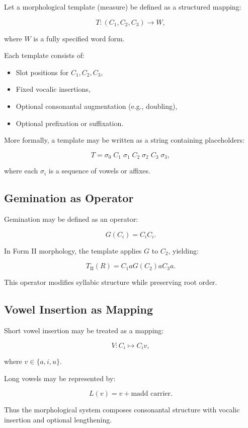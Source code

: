 \documentclass[11pt]{article}
\begin{document}
Let a morphological template (measure) be defined as a structured mapping:

\[
T : (C_1, C_2, C_3) \rightarrow W,
\]

where $W$ is a fully specified word form.

Each template consists of:

\begin{itemize}
\item Slot positions for $C_1, C_2, C_3$,
\item Fixed vocalic insertions,
\item Optional consonantal augmentation (e.g., doubling),
\item Optional prefixation or suffixation.
\end{itemize}

More formally, a template may be written as a string containing placeholders:

\[
T = \sigma_0 \; C_1 \; \sigma_1 \; C_2 \; \sigma_2 \; C_3 \; \sigma_3,
\]

where each $\sigma_i$ is a sequence of vowels or affixes.

\subsection{Gemination as Operator}

Gemination may be defined as an operator:

\[
G(C_i) = C_i C_i.
\]

In Form II morphology, the template applies $G$ to $C_2$, yielding:

\[
T_{\text{II}}(R) = C_1 a G(C_2) a C_3 a.
\]

This operator modifies syllabic structure while preserving root order.

\subsection{Vowel Insertion as Mapping}

Short vowel insertion may be treated as a mapping:

\[
V : C_i \mapsto C_i v,
\]

where $v \in \{a, i, u\}$.

Long vowels may be represented by:

\[
L(v) = v + \text{madd carrier}.
\]

Thus the morphological system composes consonantal structure with vocalic insertion and optional lengthening.
\end{document}
